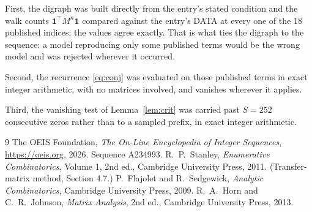 \documentclass[11pt,a4paper]{article}
\theoremstyle{plain}
\theoremstyle{definition}
\begin{document}
First, the digraph was built directly from the entry's stated condition and the walk counts
$\mathbf{1}^{\!\top}M^{n}\mathbf{1}$ compared against the entry's DATA at every one of
the $18$ published indices; the values agree exactly. That is what ties the digraph to
the sequence: a model reproducing only some published terms would be the wrong model and
was rejected wherever it occurred.

Second, the recurrence \eqref{eq:conj} was evaluated on those published terms in exact
integer arithmetic, with no matrices involved, and vanishes wherever it applies.

Third, the vanishing test of Lemma~\ref{lem:crit} was carried past $S=252$ consecutive
zeros rather than to a sampled prefix, in exact integer arithmetic.

\begin{thebibliography}{9}
 The OEIS Foundation, \emph{The On-Line Encyclopedia of Integer
Sequences}, \url{https://oeis.org}, 2026. Sequence A234993.
 R.~P.~Stanley, \emph{Enumerative Combinatorics}, Volume 1, 2nd ed.,
Cambridge University Press, 2011. (Transfer-matrix method, Section 4.7.)
 P.~Flajolet and R.~Sedgewick, \emph{Analytic Combinatorics}, Cambridge
University Press, 2009.
 R.~A.~Horn and C.~R.~Johnson, \emph{Matrix Analysis}, 2nd ed., Cambridge
University Press, 2013.
\end{thebibliography}
\end{document}
